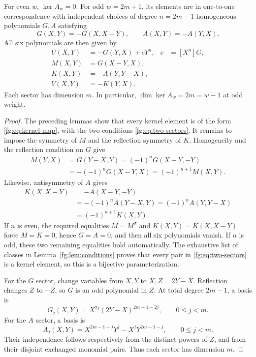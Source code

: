 \begin{theorem}
\label{fg:thm:kernel}
For even $w$, $\ker A_w=0$. For odd $w=2m+1$, its elements are in
one-to-one correspondence with independent choices of degree
$n=2m-1$ homogeneous polynomials $G,A$ satisfying
\begin{equation}\label{fg:eq:two-sectors}
 G(X,Y)=-G(X,X-Y),\qquad A(X,Y)=-A(Y,X).
\end{equation}
All six polynomials are then given by
\begin{align}
 U(X,Y)&=-G(Y,X)+cY^n,&c&=[X^n]G,\\
 M(X,Y)&=G(X-Y,X),\\
 K(X,Y)&=-A(Y,Y-X),\\
 V(X,Y)&=-K(Y,X).
 \label{fg:eq:kernel-map}
\end{align}
Each sector has dimension $m$. In particular,
$\dim\ker A_w=2m=w-1$ at odd weight.
\end{theorem}
\begin{proof}
The preceding lemmas show that every kernel element is of the form
\eqref{fg:eq:kernel-map}, with the two conditions
\eqref{fg:eq:two-sectors}. It remains to impose the symmetry of $M$
and the reflection symmetry of $K$. Homogeneity and the reflection
condition on $G$ give
\begin{align*}
 M(Y,X)&=G(Y-X,Y)
       =(-1)^nG(X-Y,-Y)\\
       &=-(-1)^nG(X-Y,X)
        =(-1)^{n+1}M(X,Y).
\end{align*}
Likewise, antisymmetry of $A$ gives
\begin{align*}
 K(X,X-Y)&=-A(X-Y,-Y)\\
         &=-(-1)^nA(Y-X,Y)
          =(-1)^nA(Y,Y-X)\\
         &=(-1)^{n+1}K(X,Y).
\end{align*}
If $n$ is even, the required equalities $M=M^\sigma$ and
$K(X,Y)=K(X,X-Y)$ force $M=K=0$, hence $G=A=0$, and then all six
polynomials vanish. If $n$ is odd, these two remaining equalities
hold automatically. The exhaustive list of classes in
Lemma~\ref{fg:lem:conditions} proves that every pair in
\eqref{fg:eq:two-sectors} is a kernel element, so this is a bijective
parameterization.

For the $G$ sector, change variables from $X,Y$ to $X,Z=2Y-X$.
Reflection changes $Z$ to $-Z$, so $G$ is an odd polynomial in $Z$.
At total degree $2m-1$, a basis is
\begin{equation}\label{fg:eq:G-basis}
 G_j(X,Y)=X^{2j}(2Y-X)^{2m-1-2j},\qquad 0\le j<m.
\end{equation}
For the $A$ sector, a basis is
\begin{equation}\label{fg:eq:A-basis}
 A_j(X,Y)=X^{2m-1-j}Y^j-X^jY^{2m-1-j},\qquad 0\le j<m.
\end{equation}
Their independence follows respectively from the distinct powers of
$Z$, and from their disjoint exchanged monomial pairs. Thus each
sector has dimension $m$.
\end{proof}

